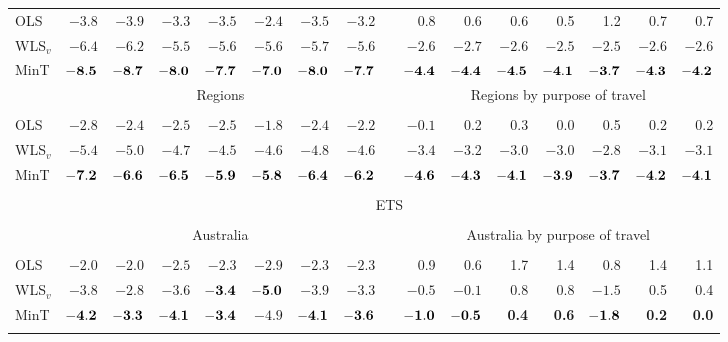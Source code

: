 \documentclass[10pt,a4paper]{article}
\begin{document}
\begin{enumerate}
{\begin{table*}[!htb]
\begin{threeparttable}
\begin{tabular}{lrrrrrrrrrrrrrrr}
				\cline{2-8}\cline{10-16} \\[-0.3cm]
				OLS & $-3.8$ & $-3.9$ & $-3.3$ & $-3.5$ & $-2.4$ & $-3.5$ & $-3.2$ & & 0.8 & 0.6 & 0.6 & 0.5 & 1.2 & 0.7 & 0.7 \\
				WLS$_v$ & $-6.4$ & $-6.2$ & $-5.5$ & $-5.6$ & $-5.6$ & $-5.7$ & $-5.6$ & & $-2.6$ & $-2.7$ & $-2.6$ & $-2.5$ & $-2.5$ & $-2.6$ & $-2.6$ \\
				MinT & $\bf{ -8.5}$ & $\bf{ -8.7}$ & $\bf{ -8.0}$ & $\bf{ -7.7}$ & $\bf{ -7.0}$ & $\bf{ -8.0}$ & $\bf{ -7.7}$ & & $\bf{ -4.4}$ & $\bf{ -4.4}$ & $\bf{ -4.5}$ & $\bf{ -4.1}$ & $\bf{ -3.7}$ & $\bf{ -4.3}$ & $\bf{ -4.2}$ \\
				& \multicolumn{7}{c}{Regions} & & \multicolumn{7}{c}{Regions by purpose of travel} \\
				\cline{2-8}\cline{10-16} \\[-0.3cm]
				OLS & $-2.8$ & $-2.4$ & $-2.5$ & $-2.5$ & $-1.8$ & $-2.4$ & $-2.2$ & & $-0.1$ & 0.2 & 0.3 & 0.0 & 0.5 & 0.2 & 0.2 \\
				WLS$_v$ & $-5.4$ & $-5.0$ & $-4.7$ & $-4.5$ & $-4.6$ & $-4.8$ & $-4.6$ & & $-3.4$ & $-3.2$ & $-3.0$ & $-3.0$ & $-2.8$ & $-3.1$ & $-3.1$ \\
				MinT & $\bf{ -7.2}$ & $\bf{ -6.6}$ & $\bf{ -6.5}$ & $\bf{ -5.9}$ & $\bf{ -5.8}$ & $\bf{ -6.4}$ & $\bf{ -6.2}$ & & $\bf{ -4.6}$ & $\bf{ -4.3}$ & $\bf{ -4.1}$ & $\bf{ -3.9}$ & $\bf{ -3.7}$ & $\bf{ -4.2}$ & $\bf{ -4.1}$ \\
				\cline{2-8}\cline{10-16} \\[-0.3cm]
				& \multicolumn{15}{c}{ETS} \\
				\cline{2-16} \\[-0.3cm]
				& \multicolumn{7}{c}{Australia} & & \multicolumn{7}{c}{Australia by purpose of travel} \\
				\cline{2-8}\cline{10-16} \\[-0.3cm]
				OLS & $-2.0$ & $-2.0$ & $-2.5$ & $-2.3$ & $-2.9$ & $-2.3$ & $-2.3$ & & 0.9 & 0.6 & 1.7 & 1.4 & 0.8 & 1.4 & 1.1 \\
				WLS$_v$ & $-3.8$ & $-2.8$ & $-3.6$ & $\bf{ -3.4}$ & $\bf{ -5.0}$ & $-3.9$ & $-3.3$ & & $-0.5$ & $-0.1$ & 0.8 & 0.8 & $-1.5$ & 0.5 & 0.4 \\
				MinT & $\bf{ -4.2}$ & $\bf{ -3.3}$ & $\bf{ -4.1}$ & $\bf{ -3.4}$ & $-4.9$ & $\bf{ -4.1}$ & $\bf{ -3.6}$ & & $\bf{ -1.0}$ & $\bf{ -0.5}$ & \bf{ 0.4} & \bf{ 0.6} & $\bf{ -1.8}$ & \bf{ 0.2} & \bf{ 0.0} \\
				\cline{2-8}\cline{10-16} \\[-0.3cm]

\end{tabular}
\end{threeparttable}
\end{table*}}
\end{enumerate}
\end{document}
